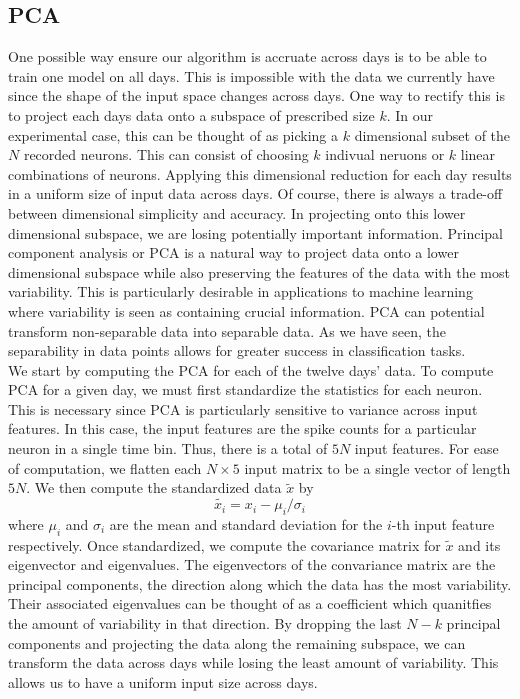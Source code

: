\documentclass[12pt]{article}
\begin{document}
\subsection{PCA}
One possible way ensure our algorithm is accruate across days is to be able to train one model on all days. This is impossible with the data we currently have since the shape of the input space changes across days. One way to rectify this is to project each days data onto a subspace of prescribed size $k$. In our experimental case, this can be thought of as picking a $k$ dimensional subset of the $N$ recorded neurons. This can consist of choosing $k$ indivual neruons or $k$ linear combinations of neurons. Applying this dimensional reduction for each day results in a uniform size of input data across days. Of course, there is always a trade-off between dimensional simplicity and accuracy. In projecting onto this lower dimensional subspace, we are losing potentially important information. Principal component analysis or PCA is a natural way to project data onto a lower dimensional subspace while also preserving the features of the data with the most variability. This is particularly desirable in applications to machine learning where variability is seen as containing crucial information. PCA can potential transform non-separable data into separable data. As we have seen, the separability in data points allows for greater success in classification tasks.\\
We start by computing the PCA for each of the twelve days' data. To compute PCA for a given day, we must first standardize the statistics for each neuron. This is necessary since PCA is particularly sensitive to variance across input features. In this case, the input features are the spike counts for a particular neuron in a single time bin. Thus, there is a total of $5N$ input features.  For ease of computation, we  flatten each $N\times5$ input matrix to be a single vector of length $5N$.  We then compute the standardized data $\tilde{x}$ by
$$ \tilde{x_i} = x_i - \mu_i / \sigma_i $$
where $\mu_i$ and $\sigma_i$ are the mean and standard deviation for the $i$-th input feature respectively. Once standardized, we compute the covariance matrix for $\tilde{x}$ and its eigenvector and eigenvalues. The eigenvectors of the convariance matrix are the principal components, the direction along which the data has the most variability. Their associated eigenvalues can be thought of as a coefficient which quanitfies the amount of variability in that direction. By dropping the last $N-k$ principal components and projecting the data along the remaining subspace, we can transform the data across days while losing the least amount of variability. This allows us to have a uniform input size across days. \\
\end{document}
